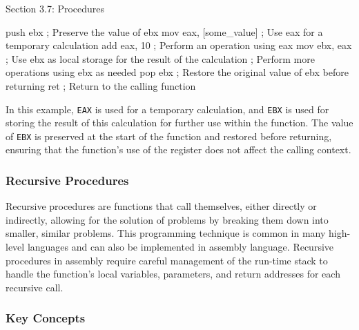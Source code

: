 \begin{notes}{Section 3.7: Procedures}
\begin{highlight}
    \begin{code}[Assembly]
    push ebx                ; Preserve the value of ebx
    mov eax, [some_value]   ; Use eax for a temporary calculation
    add eax, 10             ; Perform an operation using eax
    mov ebx, eax            ; Use ebx as local storage for the result of the calculation
    ; Perform more operations using ebx as needed
    pop ebx                 ; Restore the original value of ebx before returning
    ret                     ; Return to the calling function
    \end{code}
    
        In this example, \texttt{EAX} is used for a temporary calculation, and \texttt{EBX} is used for storing the result of this calculation for further use within the function. The value of \texttt{EBX} 
        is preserved at the start of the function and restored before returning, ensuring that the function's use of the register does not affect the calling context.
    \end{highlight}

    \subsubsection*{Recursive Procedures}

    Recursive procedures are functions that call themselves, either directly or indirectly, allowing for the solution of problems by breaking them down into smaller, similar problems. This programming 
    technique is common in many high-level languages and can also be implemented in assembly language. Recursive procedures in assembly require careful management of the run-time stack to handle the 
    function's local variables, parameters, and return addresses for each recursive call.
    
    \subsubsection*{Key Concepts}
    

\end{notes}
